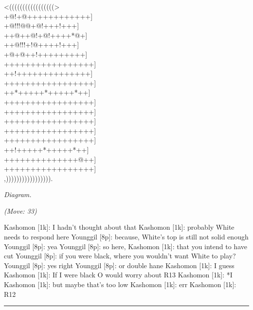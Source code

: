\documentclass[letterpaper,12pt]{memoir}
\newcounter{GoFigure}[part]
\newcommand{\gofigure}{%
 \stepcounter{GoFigure}
 \centerline{\textit{Diagram.\thinspace\arabic{GoFigure}}}
}
\newcommand{\subtext}[1]{\centerline{\textit{#1}}}
\begin{document}
\begin{minipage}[t]{0.5\textwidth}
{\gnos
<(((((((((((((((((>\\
+@!+@++++++++++++]\\
+@!!!@@+@!+++!+++]\\
++@++@!+@!++++*@+]\\
++@!!!+!@++++!+++]\\
+@+@++!+++++++++]\\
+++++++++++++++++]\\
++!++++++++++++++]\\
+++++++++++++++++]\\
++*+++++*+++++*++]\\
+++++++++++++++++]\\
+++++++++++++++++]\\
+++++++++++++++++]\\
+++++++++++++++++]\\
+++++++++++++++++]\\
++!+++++*+++++*++]\\
++++++++++++++@++]\\
+++++++++++++++++]\\
,))))))))))))))))).\\
}
\gofigure

\subtext{(Move: 33)}
\end{minipage}
\begin{minipage}[t]{0.5\textwidth}
\setlength{\parskip}{0.5em}
Kashomon [1k]: I hadn't thought about that
Kashomon [1k]: probably White needs to respond here
Younggil [8p]: because, White's top is still not solid enough
Younggil [8p]: yea
Younggil [8p]: so here, 
Kashomon [1k]: that you intend to have cut
Younggil [8p]: if you were black, where you wouldn't want White to play?
Younggil [8p]: yes right
Younggil [8p]: or double hane
Kashomon [1k]: I guess
Kashomon [1k]: If I were black O would worry about R13
Kashomon [1k]: *I
Kashomon [1k]: but maybe that's too low
Kashomon [1k]: err
Kashomon [1k]: R12


\end{minipage}
\vfill

\rule{\textwidth}{0.5pt}
\end{document}
